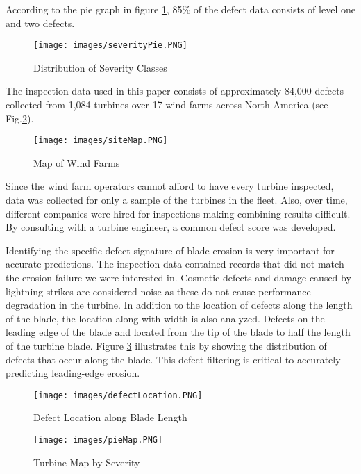 \documentclass[runningheads]{llncs}
\begin{document}
 According to the pie graph in figure \ref{fig:severityPie}, 85\% of the defect data consists of level one and two defects. 
 
\begin{figure}[H]
    \centering
    \texttt{[image: images/severityPie.PNG]}
    \caption{Distribution of Severity Classes}
    \label{fig:severityPie}
\end{figure}

 The inspection data used in this paper consists of approximately 84,000 defects collected from 1,084 turbines over 17 wind farms across North America (see Fig.\ref{fig:map}). 
 
 \begin{figure}[H]
    \centering
    \texttt{[image: images/siteMap.PNG]}
    \caption{Map of Wind Farms}
    \label{fig:map}
\end{figure}

Since the wind farm operators cannot afford to have every turbine inspected, data was collected for only a sample of the turbines in the fleet. Also, over time, different companies were hired for inspections making combining results difficult. By consulting with a turbine engineer, a common defect score was developed. 

Identifying the specific defect signature of blade erosion is very important for accurate predictions. The inspection data contained records that did not match the erosion failure we were interested in. Cosmetic defects and damage caused by lightning strikes are considered noise as these do not cause performance degradation in the turbine. In addition to the location of defects along the length of the blade, the location along with width is also analyzed. Defects on the leading edge of the blade and located from the tip of the blade to half the length of the turbine blade. Figure \ref{fig:defectLocation} illustrates this by showing the distribution of defects that occur along the blade. This defect filtering is critical to accurately predicting leading-edge erosion. 

  \begin{figure}[H]
    \centering
    \texttt{[image: images/defectLocation.PNG]}
    \caption{Defect Location along Blade Length}
    \label{fig:defectLocation}
\end{figure}


  \begin{figure}[H]
    \centering
    \texttt{[image: images/pieMap.PNG]}
    \caption{Turbine Map by Severity}
    \label{fig:mapSeverity}
\end{figure}
\end{document}
